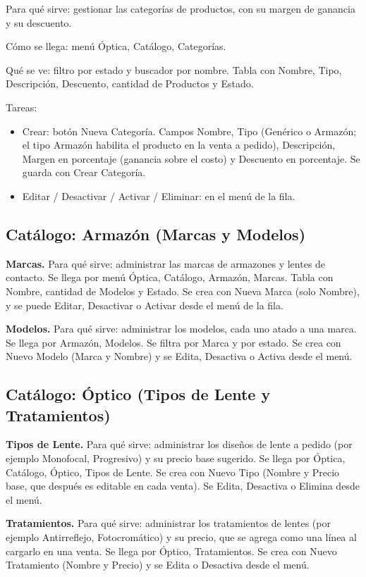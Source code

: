 Para qué sirve: gestionar las categorías de productos, con su margen de ganancia y su descuento.

Cómo se llega: menú Óptica, Catálogo, Categorías.

Qué se ve: filtro por estado y buscador por nombre. Tabla con Nombre, Tipo, Descripción, Descuento, cantidad de Productos y Estado.

Tareas:
\begin{itemize}
  \item Crear: botón Nueva Categoría. Campos Nombre, Tipo (Genérico o Armazón; el tipo Armazón habilita el producto en la venta a pedido), Descripción, Margen en porcentaje (ganancia sobre el costo) y Descuento en porcentaje. Se guarda con Crear Categoría.
  \item Editar / Desactivar / Activar / Eliminar: en el menú de la fila.
\end{itemize}

\subsection{Catálogo: Armazón (Marcas y Modelos)}
\label{sec:mu-catalogo-armazon}

\textbf{Marcas.} Para qué sirve: administrar las marcas de armazones y lentes de contacto. Se llega por menú Óptica, Catálogo, Armazón, Marcas. Tabla con Nombre, cantidad de Modelos y Estado. Se crea con Nueva Marca (solo Nombre), y se puede Editar, Desactivar o Activar desde el menú de la fila.

\textbf{Modelos.} Para qué sirve: administrar los modelos, cada uno atado a una marca. Se llega por Armazón, Modelos. Se filtra por Marca y por estado. Se crea con Nuevo Modelo (Marca y Nombre) y se Edita, Desactiva o Activa desde el menú.

\subsection{Catálogo: Óptico (Tipos de Lente y Tratamientos)}
\label{sec:mu-catalogo-optico}

\textbf{Tipos de Lente.} Para qué sirve: administrar los diseños de lente a pedido (por ejemplo Monofocal, Progresivo) y su precio base sugerido. Se llega por Óptica, Catálogo, Óptico, Tipos de Lente. Se crea con Nuevo Tipo (Nombre y Precio base, que después es editable en cada venta). Se Edita, Desactiva o Elimina desde el menú.

\textbf{Tratamientos.} Para qué sirve: administrar los tratamientos de lentes (por ejemplo Antirreflejo, Fotocromático) y su precio, que se agrega como una línea al cargarlo en una venta. Se llega por Óptico, Tratamientos. Se crea con Nuevo Tratamiento (Nombre y Precio) y se Edita o Desactiva desde el menú.

